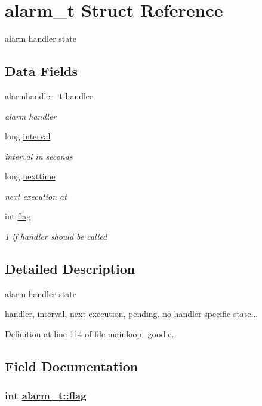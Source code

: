 \hypertarget{structalarm__t}{
\section{alarm\_\-t Struct Reference}
\label{structalarm__t}
}
alarm handler state  


\subsection*{Data Fields}
\begin{CompactItemize}
\item 
\hyperlink{mainloop__good_8c_a21}{alarmhandler\_\-t} \hyperlink{structalarm__t_o0}{handler}
\begin{CompactList}\small\item\em alarm handler \item\end{CompactList}\item 
long \hyperlink{structalarm__t_o1}{interval}
\begin{CompactList}\small\item\em interval in seconds \item\end{CompactList}\item 
long \hyperlink{structalarm__t_o2}{nexttime}
\begin{CompactList}\small\item\em next execution at \item\end{CompactList}\item 
int \hyperlink{structalarm__t_o3}{flag}
\begin{CompactList}\small\item\em 1 if handler should be called \item\end{CompactList}\end{CompactItemize}


\subsection{Detailed Description}
alarm handler state 

handler, interval, next execution, pending. no handler specific state... 



Definition at line 114 of file mainloop\_\-good.c.

\subsection{Field Documentation}
\hypertarget{structalarm__t_o3}{
\subsubsection[flag]{\setlength{\rightskip}{0pt plus 5cm}int \hyperlink{structalarm__t_o3}{alarm\_\-t::flag}}}
\label{structalarm__t_o3}


